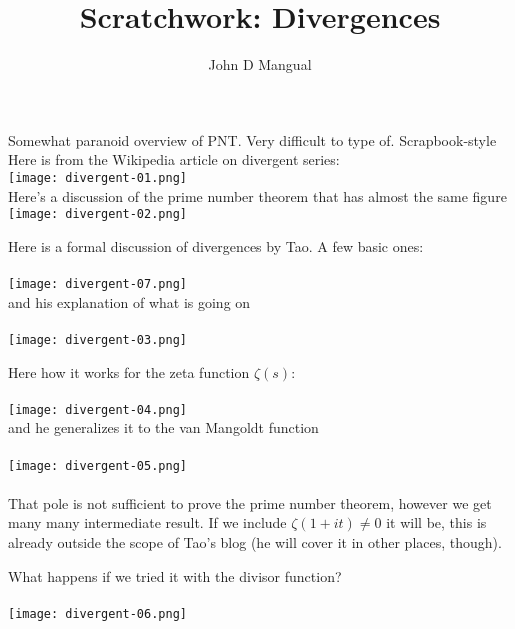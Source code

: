 \documentclass[12pt]{article}
\title{Scratchwork: Divergences}
\author{John D Mangual}
\date{}
\begin{document}
\selectfont \fontsize{12.5}{15}\selectfont

\maketitle

\noindent Somewhat paranoid overview of PNT.  Very difficult to type of.  Scrapbook-style \\
Here is from the Wikipedia article on divergent series: \\ 
\texttt{[image: divergent-01.png]}  \\

\noindent Here's a discussion of the prime number theorem that has almost the same figure \\ 
\texttt{[image: divergent-02.png]}  

\newpage

\noindent Here is a formal discussion of divergences by Tao.  A few basic ones:  \\ \\
\texttt{[image: divergent-07.png]}  \\

\noindent and his explanation of what is going on  \\ \\
\texttt{[image: divergent-03.png]}  

\newpage

\noindent Here how it works for the zeta function $\zeta(s)$:  \\ \\
\texttt{[image: divergent-04.png]}  \\

\noindent and he generalizes it to the van Mangoldt function   \\ \\
\texttt{[image: divergent-05.png]}  \\ \\
That pole is not sufficient to prove the prime number theorem, however we get many many intermediate result.  If we include $\zeta(1 + it)\neq 0$ it will be, this is already outside the scope of Tao's blog (he will cover it in other places, though).

\newpage

\noindent What happens if we tried it with the divisor function?  \\ \\
\texttt{[image: divergent-06.png]}  \\
\end{document}
